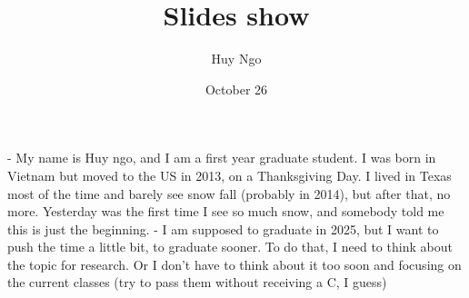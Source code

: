 \documentclass{beamer}
\title{Slides show}
\author{Huy Ngo}
\date{October 26}
\begin{document}
\begin{frame}
- My name is Huy ngo, and I am a first year graduate student. I was born in Vietnam but moved to the US in 2013, on a Thanksgiving Day. I lived in Texas most of the time and barely see snow fall (probably in 2014), but after that, no more. Yesterday was the first time I see so much snow, and somebody told me this is just the beginning.
- I am supposed to graduate in 2025, but I want to push the time a little bit, to graduate sooner. To do that, I need to think about the topic for research. Or I don't have to think about it too soon and focusing on the current classes (try to pass them without receiving a C, I guess)
\end{frame}
\end{document}
